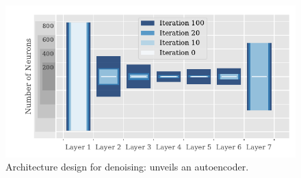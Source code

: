 \begin{minipage}[t]{\textwidth}
\begin{minipage}[b][\bottomstripheight][b]{.48\textwidth}
\begin{figure}%
\begin{minipage}{.3\textwidth}%
\caption{\small Architecture design for denoising: \LinBreg{} unveils an autoencoder.}
\vspace{210pt}

\end{minipage}%
\begin{minipage}{.7\textwidth}%
\includegraphics[trim = .7cm 0cm 0cm 0cm, clip, width=\textwidth]{atelier/Encoder.pdf}
\end{minipage}%
\end{figure}
%
%
%
\vfill%
\end{minipage}%
\end{minipage}%
%

